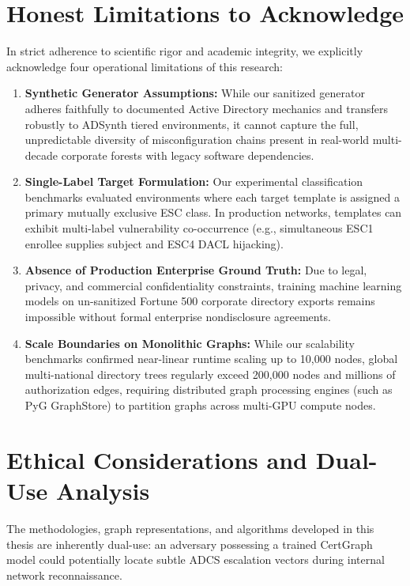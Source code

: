 \section{Honest Limitations to Acknowledge}
In strict adherence to scientific rigor and academic integrity, we explicitly acknowledge four operational limitations of this research:

\begin{enumerate}
    \item \textbf{Synthetic Generator Assumptions:} While our sanitized generator adheres faithfully to documented Active Directory mechanics and transfers robustly to ADSynth tiered environments, it cannot capture the full, unpredictable diversity of misconfiguration chains present in real-world multi-decade corporate forests with legacy software dependencies.
    \item \textbf{Single-Label Target Formulation:} Our experimental classification benchmarks evaluated environments where each target template is assigned a primary mutually exclusive ESC class. In production networks, templates can exhibit multi-label vulnerability co-occurrence (e.g., simultaneous ESC1 enrollee supplies subject and ESC4 DACL hijacking).
    \item \textbf{Absence of Production Enterprise Ground Truth:} Due to legal, privacy, and commercial confidentiality constraints, training machine learning models on un-sanitized Fortune 500 corporate directory exports remains impossible without formal enterprise nondisclosure agreements.
    \item \textbf{Scale Boundaries on Monolithic Graphs:} While our scalability benchmarks confirmed near-linear runtime scaling up to 10,000 nodes, global multi-national directory trees regularly exceed 200,000 nodes and millions of authorization edges, requiring distributed graph processing engines (such as PyG GraphStore) to partition graphs across multi-GPU compute nodes.
\end{enumerate}

\section{Ethical Considerations and Dual-Use Analysis}
The methodologies, graph representations, and algorithms developed in this thesis are inherently dual-use: an adversary possessing a trained CertGraph model could potentially locate subtle ADCS escalation vectors during internal network reconnaissance. 


